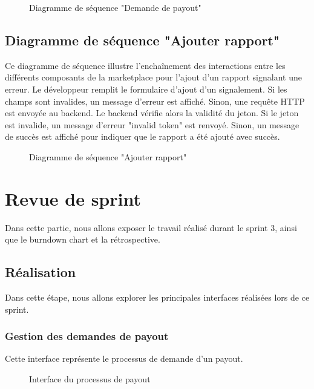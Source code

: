 \begin{figure}[H]
    \centering
    \caption{Diagramme de séquence "Demande de payout" }
    \label{fig:logo_tt}
\end{figure}
\pagebreak



\subsection{Diagramme de séquence "Ajouter rapport"}
Ce diagramme de séquence illustre l'enchaînement des interactions entre les différents composants de la marketplace pour l'ajout d'un rapport signalant une erreur. Le développeur remplit le formulaire d'ajout d’un signalement. Si les champs sont invalides, un message d'erreur est affiché. Sinon, une requête HTTP est envoyée au backend. Le backend vérifie alors la validité du jeton. Si le jeton est invalide, un message d'erreur "invalid token" est renvoyé. Sinon, un message de succès est affiché pour indiquer que le rapport a été ajouté avec succès.

\begin{figure}[H]
    \centering
    \caption{Diagramme de séquence "Ajouter rapport"    }
    \label{fig:logo_tt}
\end{figure}






\section{ Revue de sprint }
Dans cette partie, nous allons exposer le travail réalisé durant le sprint 3, ainsi que le
burndown chart et la rétrospective.
    \subsection{Réalisation}
    Dans cette étape, nous allons explorer les principales interfaces réalisées lors de ce sprint.
    \pagebreak
    \subsubsection{Gestion des demandes de payout}
    Cette interface représente le processus de demande d'un payout.
    \begin{figure}[H]
        \centering
        \caption{Interface du processus de payout  }
        \label{fig:logo_tt}
    \end{figure}

